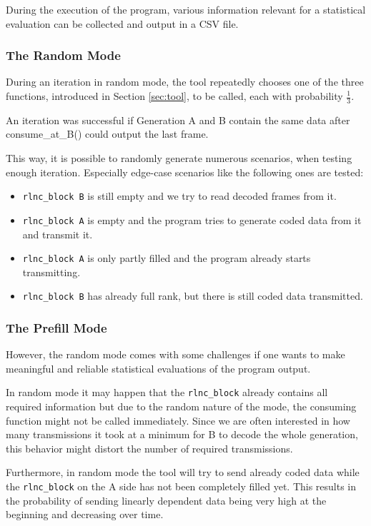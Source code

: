 \documentclass[a4paper,english,10pt]{tumarticle}
\begin{document}
During the execution of the program, various information relevant for a statistical evaluation can
be collected and output in a CSV file.

\subsubsection{The Random Mode}\label{sec:random} During an iteration in random mode, the tool
repeatedly chooses one of the three functions, introduced in Section \ref{sec:tool}, to be called,
each with probability $\frac{1}{3}$. 

An iteration was successful if Generation A and B contain the same data after consume\_at\_B() could
output the last frame.

This way, it is possible to randomly generate numerous scenarios, when testing enough iteration. 
Especially edge-case scenarios like the following ones are tested:

\begin{itemize}
  \item \texttt{rlnc\_block B} is still empty and we try to read decoded frames from it.
  \item \texttt{rlnc\_block A} is empty and the program tries to generate coded data from it and
  transmit it.
  \item \texttt{rlnc\_block A} is only partly filled and the program already starts transmitting.
  \item \texttt{rlnc\_block B} has already full rank, but there is still coded data transmitted.
\end{itemize}

\subsubsection{The Prefill Mode}\label{sec:prefill} However, the random mode comes with some
challenges if one wants to make meaningful and reliable statistical evaluations of the program
output.

In random mode it may happen that the \texttt{rlnc\_block} already contains all required information
but due to the random nature of the mode, the consuming function might not be called immediately.
Since we are often interested in how many transmissions it took at a minimum for B to decode the
whole generation, this behavior might distort the number of required transmissions.

Furthermore, in random mode the tool will try to send already coded data while the
\texttt{rlnc\_block} on the A side has not been completely filled yet. This results in the
probability of sending linearly dependent data being very high at the beginning and decreasing over
time. 
\end{document}
